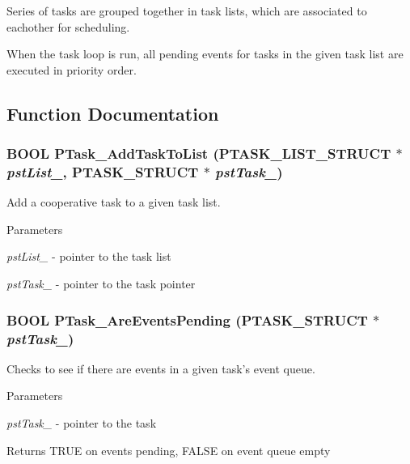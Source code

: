 Series of tasks are grouped together in task lists, which are associated to eachother for scheduling.

When the task loop is run, all pending events for tasks in the given task list are executed in priority order. 

\subsection{Function Documentation}
\subsubsection[{PTask\_\-AddTaskToList}]{\setlength{\rightskip}{0pt plus 5cm}BOOL PTask\_\-AddTaskToList ({\bf PTASK\_\-LIST\_\-STRUCT} $\ast$ {\em pstList\_\-}, \/  {\bf PTASK\_\-STRUCT} $\ast$ {\em pstTask\_\-})}\label{ptask_8c_a55c5177dafe03922b6fa944e2f2c3ee5}
Add a cooperative task to a given task list.


\begin{DoxyParams}{Parameters}
\item[{\em pstList\_\-}]-\/ pointer to the task list \item[{\em pstTask\_\-}]-\/ pointer to the task pointer \end{DoxyParams}
\subsubsection[{PTask\_\-AreEventsPending}]{\setlength{\rightskip}{0pt plus 5cm}BOOL PTask\_\-AreEventsPending ({\bf PTASK\_\-STRUCT} $\ast$ {\em pstTask\_\-})}\label{ptask_8c_a8ad1c2144cfe083f520d65c77fb3603a}
Checks to see if there are events in a given task's event queue.


\begin{DoxyParams}{Parameters}
\item[{\em pstTask\_\-}]-\/ pointer to the task \end{DoxyParams}
\begin{DoxyReturn}{Returns}
TRUE on events pending, FALSE on event queue empty 
\end{DoxyReturn}
